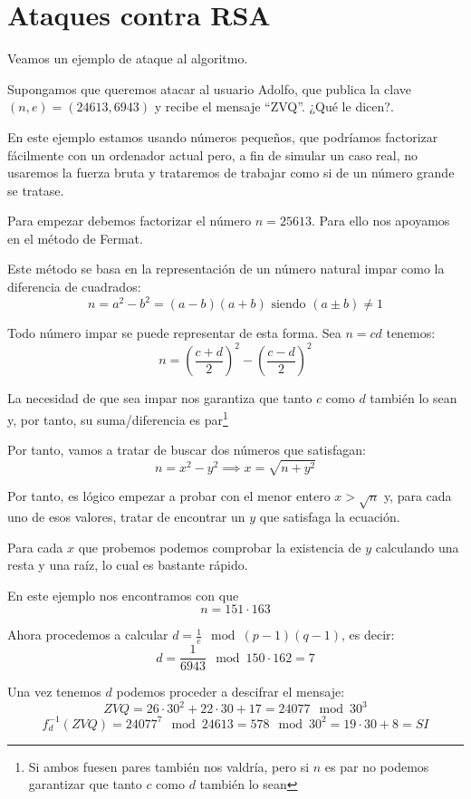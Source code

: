 \section{Ataques contra RSA}
Veamos un ejemplo de ataque al algoritmo.
\begin{example}
Supongamos que queremos atacar al usuario Adolfo, que publica la clave $(n,e) = (24613,6943)$ y recibe el mensaje ``ZVQ''. ¿Qué le dicen?.

\obs En este ejemplo estamos usando números pequeños, que podríamos factorizar fácilmente con un ordenador actual pero, a fin de simular un caso real, no usaremos la fuerza bruta y trataremos de trabajar como si de un número grande se tratase.

Para empezar debemos factorizar el número $n=25613$. Para ello nos apoyamos en el método de Fermat.

\begin{defn}
Este método se basa en la representación de un número natural impar como la diferencia de cuadrados:
\[n = a^2-b^2 = (a-b)(a+b) \text{ siendo } (a\pm b) \neq 1\]

\obs Todo número impar se puede representar de esta forma. Sea $n=cd$ tenemos:
\[n = \left( \frac{c+d}{2}\right)^2 - \left( \frac{c-d}{2}\right)^2\]

La necesidad de que sea impar nos garantiza que tanto $c$ como $d$ también lo sean y, por tanto, su suma/diferencia es par\footnote{Si ambos fuesen pares también nos valdría, pero si $n$ es par no podemos garantizar que tanto $c$ como $d$ también lo sean}
\end{defn}

Por tanto, vamos a tratar de buscar dos números que satisfagan:
\[n=x^2-y^2 \implies x = \sqrt{n+y^2}\]

Por tanto, es lógico empezar a probar con el menor entero $x>\sqrt{n}$ y, para cada uno de esos valores, tratar de encontrar un $y$ que satisfaga la ecuación.

Para cada $x$ que probemos podemos comprobar la existencia de $y$ calculando una resta y una raíz, lo cual es bastante rápido.

En este ejemplo nos encontramos con que
\[n = 151 \cdot 163\]

Ahora procedemos a calcular $d=\frac{1}{e} \mod (p-1)(q-1)$, es decir:
\[d = \frac{1}{6943} \mod 150 \cdot 162 = 7 \]

Una vez tenemos $d$ podemos proceder a descifrar el mensaje:
\[ZVQ = 26 \cdot 30^2+22 \cdot 30 +17 = 24077 \mod 30^3\]
\[f_d^{-1}(ZVQ) = 24077^7 \mod 24613 = 578 \mod 30^2 = 19\cdot 30 +8 = SI\]
\end{example}

